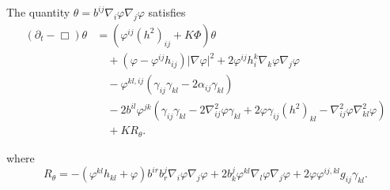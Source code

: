 \documentclass{amsart}
\begin{document}
\begin{lemma}
\label{lem:Evtheta}
The quantity $\theta = b^{ij}\nabla_i \varphi\nabla_j\varphi$ satisfies
\[
\begin{split}
(\partial_{t} - \Box)\theta &= (\varphi^{ij}(h^2)_{ij} + K\Phi)\theta \\
&\quad + (\varphi - \varphi^{ij}h_{ij})|\nabla\varphi|^{2} + 2\varphi^{ij}h^{k}_{i}\nabla_k\varphi\nabla_j\varphi \\
&\quad - \varphi^{kl,ij} (\gamma_{ij}\gamma_{kl}  - 2\alpha_{ij} \gamma_{kl}) \\
&\quad - 2b^{il} \varphi^{jk} \left(\gamma_{ij} \gamma_{kl} - 2\nabla^2_{ij} \varphi  \gamma_{kl} + 2 \varphi \gamma_{ij}(h^2)_{kl}  - \nabla^2_{ij}\varphi\nabla^2_{kl}\varphi\right) \\
&\quad + KR_{\theta}.
\end{split}
\]
\end{lemma}
where
\[
R_{\theta} = -(\varphi^{kl}h_{kl} + \varphi)b^{ir}b^{j}_{r}\nabla_i \varphi\nabla_j\varphi + 2 b^{j}_{k}\varphi^{kl}\nabla_l\varphi\nabla_j\varphi + 2 \varphi\varphi^{ij,kl} g_{ij} \gamma_{kl}.
\]
\end{document}
